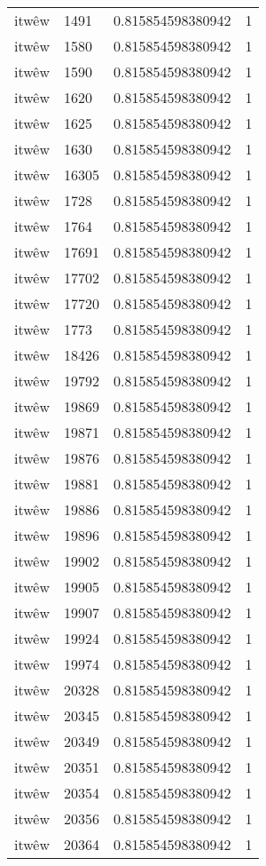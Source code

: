 \begin{longtable}{llll}
itwêw & 1491 & 0.815854598380942 & 1 \\
itwêw & 1580 & 0.815854598380942 & 1 \\
itwêw & 1590 & 0.815854598380942 & 1 \\
itwêw & 1620 & 0.815854598380942 & 1 \\
itwêw & 1625 & 0.815854598380942 & 1 \\
itwêw & 1630 & 0.815854598380942 & 1 \\
itwêw & 16305 & 0.815854598380942 & 1 \\
itwêw & 1728 & 0.815854598380942 & 1 \\
itwêw & 1764 & 0.815854598380942 & 1 \\
itwêw & 17691 & 0.815854598380942 & 1 \\
itwêw & 17702 & 0.815854598380942 & 1 \\
itwêw & 17720 & 0.815854598380942 & 1 \\
itwêw & 1773 & 0.815854598380942 & 1 \\
itwêw & 18426 & 0.815854598380942 & 1 \\
itwêw & 19792 & 0.815854598380942 & 1 \\
itwêw & 19869 & 0.815854598380942 & 1 \\
itwêw & 19871 & 0.815854598380942 & 1 \\
itwêw & 19876 & 0.815854598380942 & 1 \\
itwêw & 19881 & 0.815854598380942 & 1 \\
itwêw & 19886 & 0.815854598380942 & 1 \\
itwêw & 19896 & 0.815854598380942 & 1 \\
itwêw & 19902 & 0.815854598380942 & 1 \\
itwêw & 19905 & 0.815854598380942 & 1 \\
itwêw & 19907 & 0.815854598380942 & 1 \\
itwêw & 19924 & 0.815854598380942 & 1 \\
itwêw & 19974 & 0.815854598380942 & 1 \\
itwêw & 20328 & 0.815854598380942 & 1 \\
itwêw & 20345 & 0.815854598380942 & 1 \\
itwêw & 20349 & 0.815854598380942 & 1 \\
itwêw & 20351 & 0.815854598380942 & 1 \\
itwêw & 20354 & 0.815854598380942 & 1 \\
itwêw & 20356 & 0.815854598380942 & 1 \\
itwêw & 20364 & 0.815854598380942 & 1 \\

\end{longtable}
